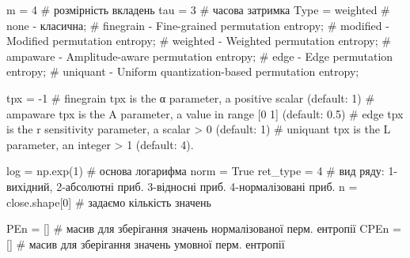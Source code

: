 \documentclass[
  letterpaper,
]{report}
\newenvironment{Shaded}{\begin{snugshade}}{\end{snugshade}}
\newcommand{\CommentTok}[1]{\textcolor[rgb]{0.37,0.37,0.37}{#1}}
\newcommand{\DecValTok}[1]{\textcolor[rgb]{0.68,0.00,0.00}{#1}}
\newcommand{\NormalTok}[1]{\textcolor[rgb]{0.00,0.23,0.31}{#1}}
\newcommand{\OperatorTok}[1]{\textcolor[rgb]{0.37,0.37,0.37}{#1}}
\newcommand{\StringTok}[1]{\textcolor[rgb]{0.13,0.47,0.30}{#1}}
\newcommand{\VariableTok}[1]{\textcolor[rgb]{0.07,0.07,0.07}{#1}}
\begin{document}
\begin{Shaded}
\begin{Highlighting}[]
\NormalTok{m }\OperatorTok{=} \DecValTok{4}             \CommentTok{\# розмірність вкладень}
\NormalTok{tau }\OperatorTok{=} \DecValTok{3}           \CommentTok{\# часова затримка}
\NormalTok{Type }\OperatorTok{=} \StringTok{\textquotesingle{}weighted\textquotesingle{}} \CommentTok{\# none {-} класична; }
                  \CommentTok{\# finegrain {-} Fine{-}grained permutation entropy; }
                  \CommentTok{\# modified {-} Modiﬁed permutation entropy; }
                  \CommentTok{\# weighted {-} Weighted permutation entropy; }
                  \CommentTok{\# ampaware {-} Amplitude{-}aware permutation entropy; }
                  \CommentTok{\# edge {-} Edge permutation entropy; }
                  \CommentTok{\# uniquant {-} Uniform quantization{-}based permutation entropy; }
            
\NormalTok{tpx }\OperatorTok{=} \OperatorTok{{-}}\DecValTok{1}          \CommentTok{\# finegrain tpx is the α parameter, a positive scalar (default: 1)}
                  \CommentTok{\# ampaware tpx is the A parameter, a value in range [0 1] (default: 0.5)}
                  \CommentTok{\# edge tpx is the r sensitivity parameter, a scalar \textgreater{} 0 (default: 1)}
                  \CommentTok{\# uniquant tpx is the L parameter, an integer \textgreater{} 1 (default: 4).}

\NormalTok{log }\OperatorTok{=}\NormalTok{ np.exp(}\DecValTok{1}\NormalTok{)    }\CommentTok{\# основа логарифма}
\NormalTok{norm }\OperatorTok{=} \VariableTok{True}
\NormalTok{ret\_type }\OperatorTok{=} \DecValTok{4}       \CommentTok{\# вид ряду: 1{-}вихідний, 2{-}абсолютні приб. 3{-}відносні приб. 4{-}нормалізовані приб. }
\NormalTok{n }\OperatorTok{=}\NormalTok{ close.shape[}\DecValTok{0}\NormalTok{] }\CommentTok{\# задаємо кількість значень}

\NormalTok{PEn }\OperatorTok{=}\NormalTok{ []           }\CommentTok{\# масив для зберігання значень нормалізованої перм. ентропії}
\NormalTok{CPEn }\OperatorTok{=}\NormalTok{ []          }\CommentTok{\# масив для зберігання значень умовної перм. ентропії}
\end{Highlighting}
\end{Shaded}
\end{document}
